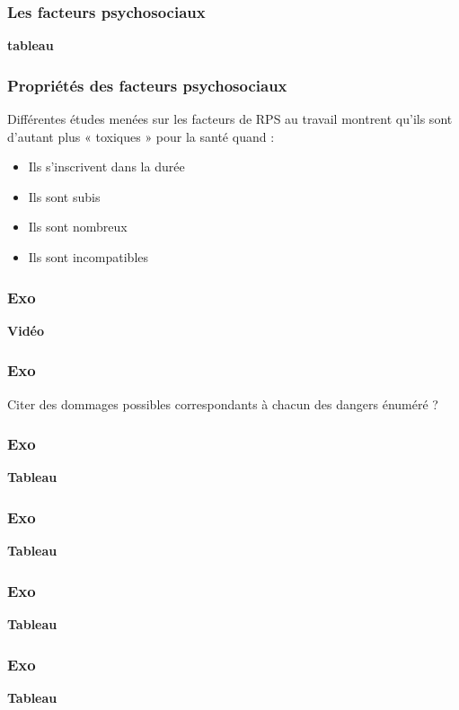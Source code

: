 \documentclass{beamer}
\begin{document}
\begin{frame}
\frametitle{Les facteurs psychosociaux}

\textbf{tableau}
\end{frame}


\begin{frame}
\frametitle{Propriétés des facteurs psychosociaux}

Différentes études menées sur les facteurs de RPS au travail montrent qu’ils sont d’autant plus « toxiques » pour la santé quand :
\begin{itemize}
	\item Ils s’inscrivent dans la durée
\item Ils sont subis
\item Ils sont nombreux
\item Ils sont incompatibles
\end{itemize}
\end{frame}

\begin{frame}
\frametitle{Exo}

\textbf{Vidéo}
\end{frame}

\begin{frame}
\frametitle{Exo}

Citer des dommages possibles correspondants à chacun des dangers énuméré ? 
\end{frame}

\begin{frame}
\frametitle{Exo}

\textbf{Tableau}
\end{frame}

\begin{frame}
\frametitle{Exo}

\textbf{Tableau}
\end{frame}

\begin{frame}
\frametitle{Exo}

\textbf{Tableau}
\end{frame}

\begin{frame}
\frametitle{Exo}

\textbf{Tableau}
\end{frame}
\end{document}
